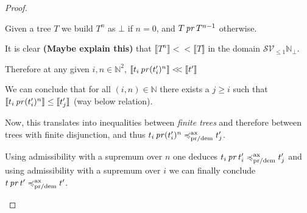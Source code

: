 \begin{proof}
\begin{itemize}
\begin{description}
    Given a tree $T$ we build $T^n$ as $\bot$ if $n = 0$, and $T \operatorname{\mathit{pr}} T^{n-1}$
    otherwise. 

    It is clear \textbf{(Maybe explain this)} that $\llbracket T^n \rrbracket <\!\!< \llbracket T \rrbracket$ 
    in the domain $\mathcal{S}\mathcal{V}_{\leq 1} \mathbb{N}_\bot$.

    Therefore at any given $i,n \in \mathbb{N}^2$, 
    $\llbracket t_i \operatorname{\mathit{pr}} (t_i')^n \rrbracket <\!\!< \llbracket t' \rrbracket$

    We can conclude that for all $(i,n) \in \mathbb{N}$ there exists a 
    $j \geq i$ such that $\llbracket t_i \operatorname{\mathit{pr}} (t_i')^n \rrbracket \leq
    \llbracket t_j' \rrbracket$ (way below relation).

    Now, this translates into inequalities between \emph{finite trees}
    and therefore between trees with finite disjunction, and thus 
    $ t_i \operatorname{\mathit{pr}} (t_i')^n \preccurlyeq^{\text{ax}}_{\text{pr/dem}} t_j'$.

    Using admissibility with a supremum over $n$ 
    one deduces $t_i \operatorname{\mathit{pr}} t_i' \preccurlyeq^{\text{ax}}_{\text{pr/dem}} t_j'$
    and using admissibility with a supremum over $i$ we can finally conclude
    $t \operatorname{\mathit{pr}} t' \preccurlyeq^{\text{ax}}_{\text{pr/dem}} t'$.
    \end{description}
    \end{itemize}
    

\end{proof}

